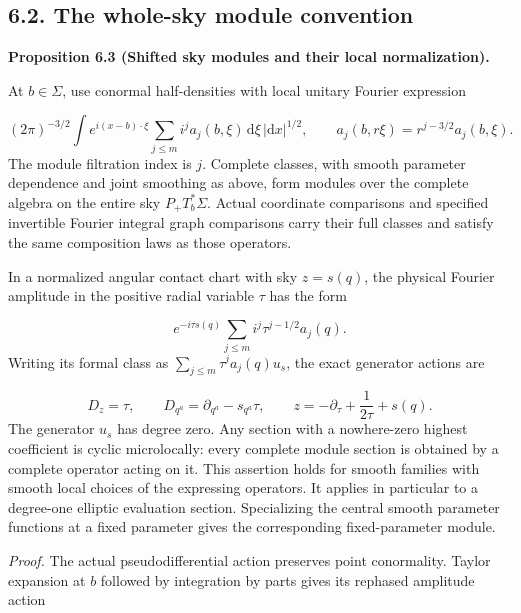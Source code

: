 \documentclass[
  english,
  11pt,
  reqno]{amsart}
\makeatletter
\newcommand{\pandocstatementheading}[1]{%
  \par\addpenalty{\@beginparpenalty}%
  \addvspace{.5\baselineskip plus .2\baselineskip minus .2\baselineskip}%
  {\normalfont\bfseries #1\par}%
  \nobreak\@afterindenttrue\@afterheading
}
\makeatother
\begin{document}
\subsection{6.2. The whole-sky module
convention}\label{the-whole-sky-module-convention}\label{sec:online-shifted-lagrangian-modules}

\pandocstatementheading{\leavevmode{}\label{prop:online-shifted-sky-modules}Proposition 6.3 (Shifted sky modules and their local normalization).}

At \(b\in\Sigma\), use conormal half-densities with local unitary
Fourier expression

\label{eq:online-shifted-point-conormal} \[
(2\pi)^{-3/2}\int
 e^{i(x-b)\cdot\xi}
 \sum_{j\le m}i^j a_j(b,\xi)\,\mathrm d\xi
 \,|\mathrm dx|^{1/2},
\qquad
a_j(b,r\xi)=r^{j-3/2}a_j(b,\xi).
\] The module filtration index is \(j\). Complete classes, with smooth
parameter dependence and joint smoothing as above, form modules over the
complete algebra on the entire sky \(P_+T_b^*\Sigma\). Actual coordinate
comparisons and specified invertible Fourier integral graph comparisons
carry their full classes and satisfy the same composition laws as those
operators.

In a normalized angular contact chart with sky \(z=s(q)\), the physical
Fourier amplitude in the positive radial variable \(\tau\) has the form

\label{eq:online-shifted-contact-amplitude} \[
e^{-i\tau s(q)}\sum_{j\le m}i^j\tau^{j-1/2}a_j(q).
\] Writing its formal class as \(\sum_{j\le m}\tau^j a_j(q)u_s\), the
exact generator actions are

\label{eq:online-shifted-module-generator-actions} \[
D_z=\tau,\qquad
D_{q^a}=\partial_{q^a}-s_{q^a}\tau,
\qquad
z=-\partial_\tau+\frac1{2\tau}+s(q).
\] The generator \(u_s\) has degree zero. Any section with a
nowhere-zero highest coefficient is cyclic microlocally: every complete
module section is obtained by a complete operator acting on it. This
assertion holds for smooth families with smooth local choices of the
expressing operators. It applies in particular to a degree-one elliptic
evaluation section. Specializing the central smooth parameter functions
at a fixed parameter gives the corresponding fixed-parameter module.

\emph{Proof.} The actual pseudodifferential action preserves point
conormality. Taylor expansion at \(b\) followed by integration by parts
gives its rephased amplitude action
\end{document}
